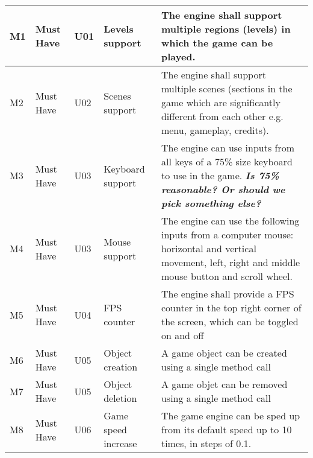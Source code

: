 \documentclass{article} %
\begin{document}
\begin{longtable}{|p{}|p{}|p{}|p{}|p{}|}
    M1                          & Must Have                          & U01                & Levels support              & The engine shall support multiple regions (levels) in which the game can be played.                                                                         \\ \hline
    M2                          & Must Have                          & U02                & Scenes support              & The engine shall support multiple scenes (sections in the game which are significantly different from each other e.g. menu, gameplay, credits).             \\ \hline
    M3                          & Must Have                          & U03                & Keyboard support            & The engine can use inputs from all keys of a 75\% size keyboard to use in the game. \textit{\textbf{Is 75\% reasonable? Or should we pick something else?}} \\ \hline
    M4                          & Must Have                          & U03                & Mouse support               & The engine can use the following inputs from a computer mouse: horizontal and vertical movement, left, right and middle mouse button and scroll wheel.      \\ \hline
    M5                          & Must Have                          & U04                & FPS counter                 & The engine shall provide a FPS counter in the top right corner of the screen, which can be toggled on and off                                               \\ \hline
    M6                          & Must Have                          & U05                & Object creation             & A game object can be created using a single method call                                                                                                     \\ \hline
    M7                          & Must Have                          & U05                & Object deletion             & A game objet can be removed using a single method call                                                                                                      \\ \hline
    M8                          & Must Have                          & U06                & Game speed increase         & The game engine can be sped up from its default speed up to 10 times, in steps of 0.1.                                                                      \\ \hline

\end{longtable}
\end{document}
